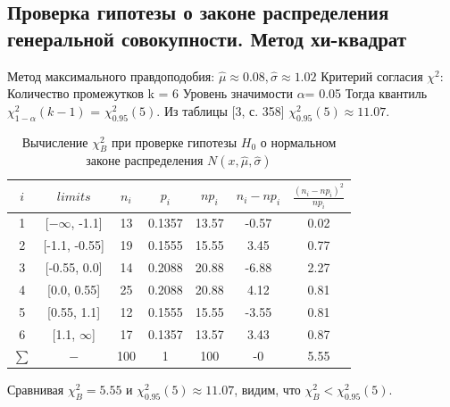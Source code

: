 \subsection{Проверка гипотезы о законе распределения генеральной совокупности. Метод хи-квадрат}
Метод максимального правдоподобия:
\newline
$\hat{\mu} \approx 0.08, \hat{\sigma} \approx 1.02$
\newline
Критерий согласия $\chi^{2}$:
\newline
Количество промежутков k = 6
\newline
Уровень значимости $\alpha$= 0.05
\newline
Тогда квантиль $\chi^{2}_{1-\alpha}(k-1)$ = $\chi^{2}_{0.95}(5)$. Из таблицы [3, с. 358] $\chi^{2}_{0.95}(5) \approx 11.07$. 
\begin{table}[H]
	\centering
	\begin{tabular}{| c | c | c | c | c | c | c |}
		\hline
		$i$ & $limits$         &   $n_i$ &    $p_i$ &   $np_i$ &   $n_i - np_i$ &   $\frac{(n_i-np_i)^2}{np_i}$ \\
		\hline
		1 & [$-\infty$, -1.1] &    13 & 0.1357 &  13.57 &        -0.57 &                        0.02 \\
		2 & [-1.1, -0.55]  &    19 & 0.1555 &  15.55 &         3.45 &                        0.77 \\
		3 & [-0.55, 0.0]   &    14 & 0.2088 &  20.88 &        -6.88 &                        2.27 \\
		4 & [0.0, 0.55]    &    25 & 0.2088 &  20.88 &         4.12 &                        0.81 \\
		5 & [0.55, 1.1]    &    12 & 0.1555 &  15.55 &        -3.55 &                        0.81 \\
		6 & [1.1,  $\infty$]   &    17 & 0.1357 &  13.57 &         3.43 &                        0.87 \\
		$\sum$ & $-$              &   100 & 1      & 100    &        -0    &                        5.55 \\
		\hline
	\end{tabular}
	\caption{ Вычисление $\chi^{2}_{B}$ при проверке гипотезы $H_{0}$ о нормальном законе распределения $N(x,\hat{\mu}, \hat{\sigma})$}
	\label{tab:normal_chi_2}
\end{table} 

Сравнивая $\chi^{2}_{B} = 5.55$ и $\chi^{2}_{0.95}(5) \approx 11.07$, видим, что $\chi^{2}_{B} < \chi^{2}_{0.95}(5)$.

